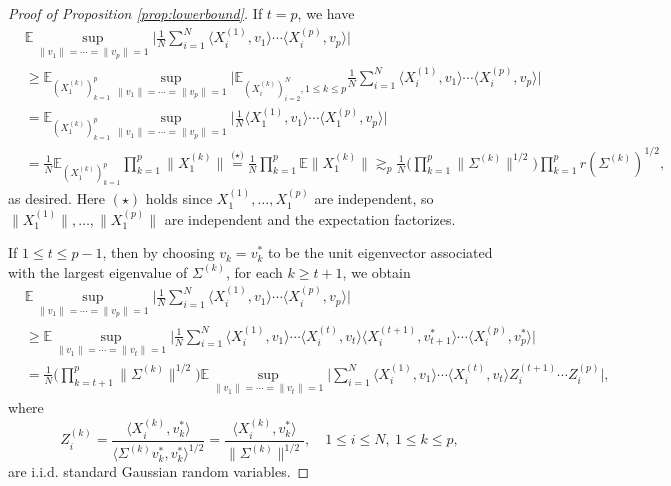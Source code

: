 \documentclass[numbers,webpdf,imaiai]{ima-authoring-template}
\theoremstyle{thmstyletwo}%
\numberwithin{equation}{section}
\numberwithin{equation}{section}
\newcommand{\E}{\mathbb{E}}
\begin{document}
\begin{proof}[Proof of Proposition \ref{prop:lowerbound}]
If $t=p$, we have
\begin{align*}
   &\E \sup_{\|v_1\|= \cdots =\|v_p\|=1} \bigg| \frac{1}{N}\sum_{i=1}^N \langle X^{(1)}_i,v_1\rangle \cdots \langle X^{(p)}_i, v_p \rangle \bigg|\\
   &\ge \E_{(X_1^{(k)})_{k=1}^{p}} \sup_{\|v_1\|= \cdots =\|v_p\|=1}  \bigg|\E_{(X_i^{(k)})_{i=2}^{N},1\le k\le p}\frac{1}{N}\sum_{i=1}^N \langle X^{(1)}_i,v_1\rangle \cdots \langle X^{(p)}_i, v_p \rangle \bigg|\\
   &=\E_{(X_1^{(k)})_{k=1}^{p}} \sup_{\|v_1\|= \cdots =\|v_p\|=1}  \bigg| \frac{1}{N} \langle X^{(1)}_1,v_1\rangle \cdots \langle X^{(p)}_1, v_p \rangle \bigg|\\
   &=\frac{1}{N}\E_{(X_1^{(k)})_{k=1}^{p}}\prod_{k=1}^{p}\|X_1^{(k)}\| \overset{\text{($\star$)}}{=} \frac{1}{N}\prod_{k=1}^{p}\E \|X_1^{(k)}\|  \gtrsim_p \frac{1}{N}  \bigg(\prod_{k=1}^p\|\Sigma^{(k)}\|^{1 / 2}\bigg) \prod_{k=1}^{p}r(\Sigma^{(k)})^{1/2},
\end{align*}
as desired. Here $(\star)$ holds since $X^{(1)}_1,\ldots, X^{(p)}_1$ are independent, so $\|X^{(1)}_1\|,\ldots, \|X^{(p)}_1\|$ are independent and the expectation factorizes.


If $1 \le t \le p-1$, then by choosing $v_k=v^{*}_k$ to be the unit eigenvector associated with the largest eigenvalue of $\Sigma^{(k)}$, for each $k \ge t+1$, we obtain 
\begin{align}\label{eq:lowerbound_aux1}
&\E \sup_{\|v_1\|= \cdots =\|v_p\|=1} \bigg| \frac{1}{N}\sum_{i=1}^N \langle X^{(1)}_i,v_1\rangle \cdots \langle X^{(p)}_i, v_p \rangle \bigg|\nonumber\\
    &\ge \E \sup_{\|v_1\|= \cdots =\|v_t\|=1} \bigg| \frac{1}{N}\sum_{i=1}^N \langle X^{(1)}_i,v_1\rangle \cdots \langle X^{(t)}_i, v_t \rangle \langle X^{(t+1)}_i, v^{*}_{t+1} \rangle\cdots \langle X^{(p)}_i, v^{*}_p \rangle\bigg| \nonumber\\
    &= \frac{1}{N}\bigg(\prod_{k=t+1}^p\|\Sigma^{(k)}\|^{1 / 2}\bigg) \E \sup_{\|v_1\|= \cdots =\|v_t\|=1} \bigg| \sum_{i=1}^N \langle X^{(1)}_i,v_1\rangle \cdots \langle X^{(t)}_i, v_t \rangle Z^{(t+1)}_i\cdots Z^{(p)}_i \bigg|,
\end{align}
where \[
Z^{(k)}_i =\frac{\langle X^{(k)}_i,v^*_k \rangle}{\langle \Sigma^{(k)} v^*_k ,v^*_k\rangle^{1/2}}=\frac{\langle X^{(k)}_i,v^*_k \rangle}{\|\Sigma^{(k)}\|^{1/2}},\quad 1\le i\le N, \ 1\le k\le p,
\]
are i.i.d. standard Gaussian random variables.


\end{proof}
\end{document}
